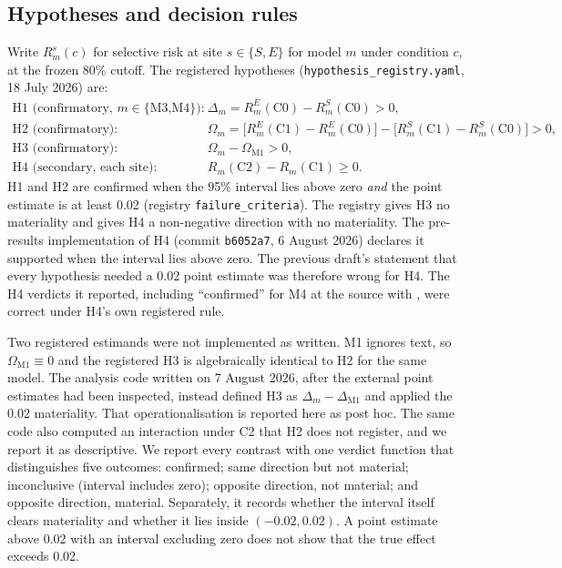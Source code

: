 \subsection{Hypotheses and decision rules}
Write $R^{s}_{m}(c)$ for selective risk at site $s\in\{S,E\}$ for model $m$
under condition $c$, at the frozen 80\% cutoff. The registered hypotheses
(\texttt{hypothesis\_registry.yaml}, 18 July 2026) are:
\begin{align*}
\text{H1 (confirmatory, } m\in\{\text{M3,M4}\}\text{):}\quad
&\Delta_m = R^{E}_{m}(\text{C0})-R^{S}_{m}(\text{C0}) > 0,\\
\text{H2 (confirmatory):}\quad
&\Omega_m = \bigl[R^{E}_{m}(\text{C1})-R^{E}_{m}(\text{C0})\bigr]-\bigl[R^{S}_{m}(\text{C1})-R^{S}_{m}(\text{C0})\bigr] > 0,\\
\text{H3 (confirmatory):}\quad
&\Omega_{m}-\Omega_{\text{M1}} > 0,\\
\text{H4 (secondary, each site):}\quad
&R_{m}(\text{C2})-R_{m}(\text{C1}) \ge 0 .
\end{align*}
H1 and H2 are confirmed when the 95\% interval lies above zero \emph{and} the
point estimate is at least 0.02 (registry \texttt{failure\_criteria}). The
registry gives H3 no materiality and gives H4 a non-negative direction with no
materiality. The pre-results implementation of H4 (commit \texttt{b6052a7}, 6
August 2026) declares it supported when the interval lies above zero. The
previous draft's statement that every hypothesis needed a 0.02 point estimate
was therefore wrong for H4. The H4 verdicts it reported, including
``confirmed'' for M4 at the source with \HFourMFoursourceOrigPt{}, were correct under H4's own
registered rule.

Two registered estimands were not implemented as written. M1 ignores text, so
$\Omega_{\text{M1}}\equiv 0$ and the registered H3 is algebraically identical to
H2 for the same model. The analysis code written on 7 August 2026, after the
external point estimates had been inspected, instead defined H3 as
$\Delta_m-\Delta_{\text{M1}}$ and applied the 0.02 materiality. That
operationalisation is reported here as post hoc. The same code also computed
an interaction under C2 that H2 does not register, and we report it as
descriptive. We report every contrast with one verdict function that
distinguishes five outcomes: confirmed; same direction but not material;
inconclusive (interval includes zero); opposite direction, not material; and
opposite direction, material. Separately, it records whether the interval
itself clears materiality and whether it lies inside $(-0.02,0.02)$. A point
estimate above 0.02 with an interval excluding zero does not show that the true
effect exceeds 0.02.


